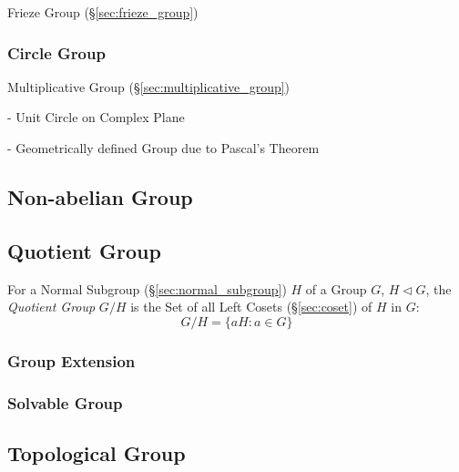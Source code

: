 \begin{itemize}
Frieze Group (\S\ref{sec:frieze_group})



\subsubsection{Circle Group}\label{sec:circle_group}

Multiplicative Group (\S\ref{sec:multiplicative_group})

- Unit Circle on Complex Plane

- Geometrically defined Group due to Pascal's Theorem
  \cite{lemmermeyer-shirali09}



\subsection{Non-abelian Group}\label{sec:nonabelian_group}

\subsection{Quotient Group}\label{sec:quotient_group}

For a Normal Subgroup (\S\ref{sec:normal_subgroup}) $H$ of a Group
$G$, $H \triangleleft G$, the \emph{Quotient Group} $G/H$ is the Set
of all Left Cosets (\S\ref{sec:coset}) of $H$ in $G$:
\[
    G/H = \{ aH : a \in G \}
\]



\subsubsection{Group Extension}\label{sec:group_extension}

\subsubsection{Solvable Group}\label{sec:solvable_group}



\subsection{Topological Group}\label{sec:topological_group}


\end{itemize}
